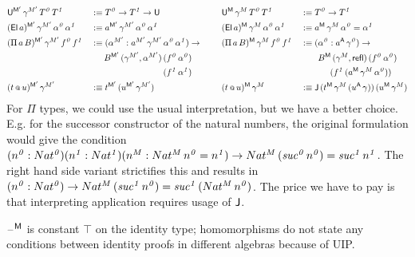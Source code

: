 \documentclass[acmsmall,screen]{acmart}
\begin{document}
\begin{alignat*}{10}
  & \U^{\M'}\,\gamma^{M'}\,T^{\mathit{0}}\,T^{\mathit{1}} && :\equiv T^{\mathit{0}}\ra T^{\mathit{1}}\ra\U  && \U^\M\,\gamma^M\,T^{\mathit{0}}\,T^{\mathit{1}} && :\equiv T^{\mathit{0}}\ra T^{\mathit{1}} \\
  & (\El\,a)^{\M'}\,\gamma^{M'}\,\alpha^{\mathit{0}}\,\alpha^{\mathit{1}} && :\equiv a^{\M'}\,\gamma^{M'}\,\alpha^{\mathit{0}}\,\alpha^{\mathit{1}} && (\El\,a)^\M\,\gamma^M\,\alpha^{\mathit{0}}\,\alpha^{\mathit{1}} && :\equiv a^\M\,\gamma^M\,\alpha^{\mathit{0}} = \alpha^{\mathit{1}} \\
  & (\Pi\,a\,B)^{\M'}\,\gamma^{M'}\,f^{\mathit{0}}\,f^{\mathit{1}} && :\equiv (\alpha^{M'}:a^{M'}\,\gamma^{M'}\,\alpha^{\mathit{0}}\,\alpha^{\mathit{1}})\ra\hspace{1.5em}  && (\Pi\,a\,B)^\M\,\gamma^M\,f^{\mathit{0}}\,f^{\mathit{1}} && :\equiv (\alpha^{\mathit{0}}:a^\A\,\gamma^{\mathit{0}})\ra \\
  &  && \hspace{1.5em} B^{\M'}\,(\gamma^{M'}, \alpha^{M'})\,(f^{\mathit{0}}\,\alpha^{\mathit{0}}) &&  && \hspace{2em} B^\M\,(\gamma^M, \refl)\,(f^{\mathit{0}}\,\alpha^{\mathit{0}}) \\
  &  && \hspace{1.5em} \hphantom{B^{\M'}\,(\gamma^{M'}, \alpha^{M'})\,} (f^{\mathit{1}}\,\alpha^{\mathit{1}}) &&  && \hspace{3.4em}(f^{\mathit{1}}\,(a^\M\,\gamma^M\,\alpha^{\mathit{0}})) \\
  & (t\app u)^{\M'}\,\gamma^{M'} && :\equiv t^{\M'}\,(u^{\M'}\,\gamma^{M'}) && (t\app u)^\M\,\gamma^M && :\equiv \J\,(t^\M\,\gamma^M\,(u^\A\,\gamma))\,(u^\M\,\gamma^M)
\end{alignat*}
For $\Pi$ types, we could use the usual interpretation, but we have a
better choice. E.g. for the successor constructor of the natural
numbers, the original formulation would give the condition
$(n^{\mathit{0}}:Nat^{\mathit{0}})(n^{\mathit{1}}:Nat^{\mathit{1}})(n^{M}:Nat^M\,n^{\mathit{0}}
= n^{\mathit{1}})\rightarrow
Nat^M\,(\mathit{suc}^{\mathit{0}}\,n^{\mathit{0}}) =
\mathit{suc^{\mathit{1}}}\, n^{\mathit{1}}$. The right hand side
variant strictifies this and results in
$(n^{\mathit{0}}:Nat^{\mathit{0}})\rightarrow
Nat^M\,(\mathit{suc}^{\mathit{1}}\,n^{\mathit{0}}) =
\mathit{suc}^{\mathit{1}}\,(Nat^M\,n^{\mathit{0}})$. The price we have
to pay is that interpreting application requires usage of $\mathsf{J}$.

$\mathord{\hspace{1pt}\text{--}\hspace{1pt}}^{\mathsf{M}}$ is constant $\top$ on the identity type; homomorphisms
do not state any conditions between identity proofs in different
algebras because of UIP.
\end{document}
